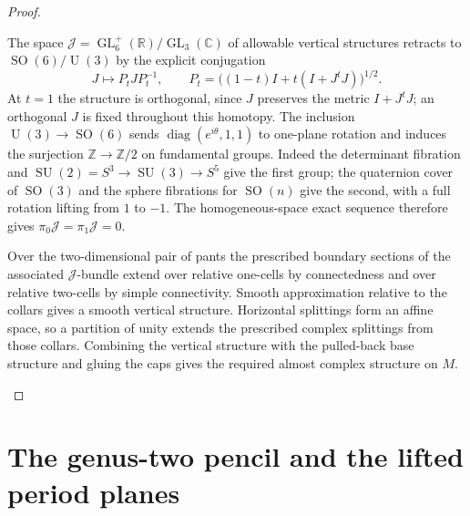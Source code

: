 \documentclass[11pt,a4paper]{article}
\numberwithin{equation}{section}
\theoremstyle{definition}
\begin{document}
\begin{proof}
\begin{enumerate}[label=\arabic*.,leftmargin=*]
The space $\mathcal J=\operatorname{GL}_6^+(\mathbb R)/
\operatorname{GL}_3(\mathbb C)$ of allowable vertical structures
retracts to $\operatorname{SO}(6)/\operatorname{U}(3)$ by the explicit
conjugation
\[
 J\longmapsto P_tJP_t^{-1},
 \qquad P_t=\bigl((1-t)I+t(I+J^tJ)\bigr)^{1/2}.
\]
At $t=1$ the structure is orthogonal, since $J$ preserves the metric
$I+J^tJ$; an orthogonal $J$ is fixed throughout this homotopy.
The inclusion $\operatorname{U}(3)\to\operatorname{SO}(6)$ sends
$\operatorname{diag}(e^{i\theta},1,1)$ to one-plane rotation and
induces the surjection $\mathbb Z\to\mathbb Z/2$ on fundamental
groups. Indeed the determinant fibration and
$\operatorname{SU}(2)=S^3\to\operatorname{SU}(3)\to S^5$ give the
first group; the quaternion cover of $\operatorname{SO}(3)$ and
the sphere fibrations for $\operatorname{SO}(n)$ give the second,
with a full rotation lifting from $1$ to $-1$. The homogeneous-space
exact sequence therefore gives $\pi_0\mathcal J=\pi_1\mathcal J=0$.

Over the two-dimensional pair of pants the prescribed boundary
sections of the associated $\mathcal J$-bundle extend over relative
one-cells by connectedness and over relative two-cells by simple
connectivity. Smooth approximation relative to the collars gives
a smooth vertical structure. Horizontal splittings form an affine
space, so a partition of unity extends the prescribed complex
splittings from those collars. Combining the vertical structure with
the pulled-back base structure and gluing the caps gives the required
almost complex structure on $M$.

\end{enumerate}
\end{proof}

\section{The genus-two pencil and the lifted period planes}\label{pub:V:sec-periods}
\end{document}
